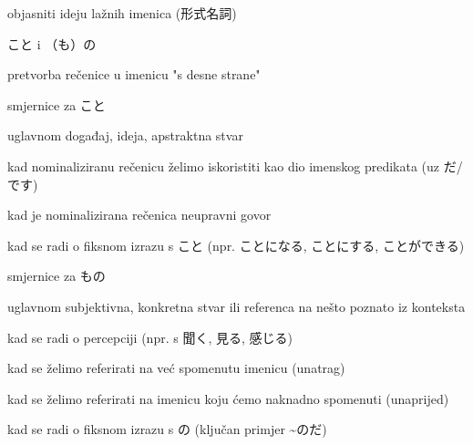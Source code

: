 
\author{Tomislav Mamić}

	
	\begin{hyou}
		\item objasniti ideju lažnih imenica (形式名詞)
		\item こと i （も）の
		\item pretvorba rečenice u imenicu "s desne strane"
		\item smjernice za こと
		\begin{hyou}
			\item uglavnom događaj, ideja, apstraktna stvar
			\item kad nominaliziranu rečenicu želimo iskoristiti kao dio imenskog predikata (uz だ/です)
			\item kad je nominalizirana rečenica neupravni govor
			\item kad se radi o fiksnom izrazu s こと (npr. ことになる, ことにする, ことができる)
		\end{hyou}
		\item smjernice za もの
		\begin{hyou}
			\item uglavnom subjektivna, konkretna stvar ili referenca na nešto poznato iz konteksta
			\item kad se radi o percepciji (npr. s 聞く, 見る, 感じる)
			\item kad se želimo referirati na već spomenutu imenicu (unatrag)
			\item kad se želimo referirati na imenicu koju ćemo naknadno spomenuti (unaprijed)
			\item kad se radi o fiksnom izrazu s の (ključan primjer \textasciitilde のだ)
		\end{hyou}
	\end{hyou}
